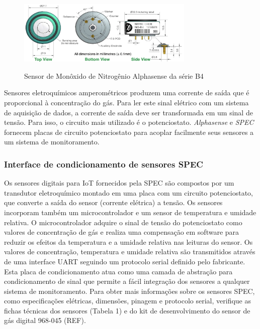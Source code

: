 \begin{figure}
    \centering
    \caption{Sensor de Monôxido de Nitrogênio Alphasense da série B4}
    \begin{center}
        \includegraphics[width=0.75\textwidth]{aftertext/Principais componentes de hardware/Figuras/Sensores serie B4.png}
    \label{fig:alphasense-b4}
    \end{center}
\end{figure}

Sensores eletroquímicos amperométricos produzem uma corrente de saída que é proporcional à concentração do gás. Para ler este sinal elétrico com um sistema de aquisição de dados, a corrente de saída deve ser transformada em um sinal de tensão. Para isso, o circuito mais utilizado é o potenciostato. \textit{Alphasense} e \textit{SPEC} fornecem placas de circuito potenciostato para acoplar facilmente seus sensores a um sistema de monitoramento.

\subsubsection{Interface de condicionamento de sensores SPEC}

Os sensores digitais para IoT fornecidos pela SPEC são compostos por um transdutor eletroquímico montado em uma placa com um circuito potenciostato, que converte a saída do sensor (corrente elétrica) a tensão. Os sensores incorporam também um microcontrolador e um sensor de temperatura e umidade relativa. O microcontrolador adquire o sinal de tensão do potenciostato como valores de concentração de gás e realiza uma compensação em software para reduzir os efeitos da temperatura e a umidade relativa nas leituras do sensor. Os valores de concentração, temperatura e umidade relativa são transmitidos através de uma interface UART seguindo um protocolo serial definido pelo fabricante. Esta placa de condicionamento atua como uma camada de abstração para condicionamento de sinal que permite a fácil integração dos sensores a qualquer sistema de monitoramento. Para obter mais informações sobre os sensores SPEC, como especificações elétricas, dimensões, pinagem e protocolo serial, verifique as fichas técnicas dos sensores (Tabela 1) e do kit de desenvolvimento do sensor de gás digital 968-045 (REF).

